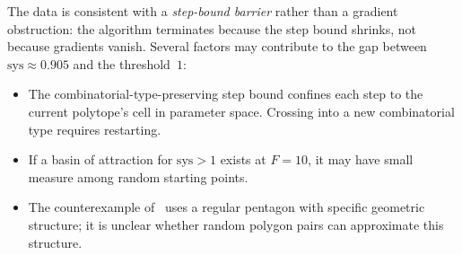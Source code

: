 The data is consistent with a \emph{step-bound barrier}
rather than a gradient obstruction:
the algorithm terminates because the step bound shrinks,
not because gradients vanish.
Several factors may contribute to the gap between
$\mathrm{sys} \approx 0.905$ and the threshold~$1$:
\begin{itemize}
\item The combinatorial-type-preserving step bound confines each step
  to the current polytope's cell in parameter space.
  Crossing into a new combinatorial type requires restarting.
\item If a basin of attraction for $\mathrm{sys} > 1$ exists at
  $F = 10$, it may have small measure among random starting points.
\item The counterexample of~\cite{HaimKislevOstrover2024} uses a regular
  pentagon with specific geometric structure; it is unclear whether
  random polygon pairs can approximate this structure.
\end{itemize}
